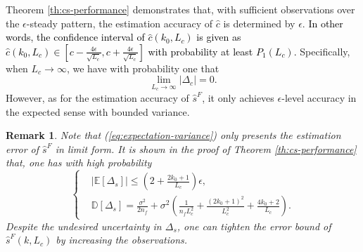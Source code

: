 \documentclass[12pt,journal,draftclsnofoot,onecolumn]{IEEEtran}
\newtheorem{remark}{Remark}
\let \sss=\scriptscriptstyle
\begin{document}
Theorem \ref{th:cs-performance} demonstrates that, with sufficient observations over the $\epsilon$-steady pattern, the estimation accuracy of $\hat c$ is determined by $\epsilon$. 
\textcolor{black}{In other words, the confidence interval of $\hat c(k_0,L_c)$ is given as $\hat c(k_0,L_c) \in[c-\frac{4\epsilon}{\sqrt{L_c}},c+\frac{4\epsilon}{\sqrt{L_c}}]$ with probability at least $P_1(L_c)$.}
Specifically, when $L_c\to\infty$, we have with probability one that 
\begin{equation}
\mathop {\lim }\limits_{L_c \to \infty } | \Delta_c | =0 . 
\end{equation}
However, as for the estimation accuracy of $\hat s^{\sss F}$, it only achieves $\epsilon$-level accuracy in the expected sense with bounded variance. 

\begin{remark}
Note that (\ref{eq:expectation-variance}) only presents the estimation error of $\hat s^{\sss F}$ in limit form. 
It is shown in the proof of Theorem \ref{th:cs-performance} that, one has with high probability 
\begin{equation}
\! \left \{
\begin{aligned}
&| \mathbb{E}[\Delta_s]  | \!\le\! (2 \! + \!\frac{2{k_0}+1}{L_c})\epsilon, \\
&\mathbb{D}[\Delta_s]  \!= \! \frac{\sigma^2}{2n_f} \! + \!\sigma^2(\frac{1}{n_f L_c^2} \!+\! \frac{(2{k_0}+1)^2}{L_c^2} \!+\! \frac{4{k_0}+2}{L_c} ). 
\end{aligned} \right.\!\!
\end{equation}
Despite the undesired uncertainty in $\Delta_s$, one can tighten the error bound of $\hat{s}^{\sss F}(k,L_c)$ by increasing the observations. 
\end{remark}
\end{document}
